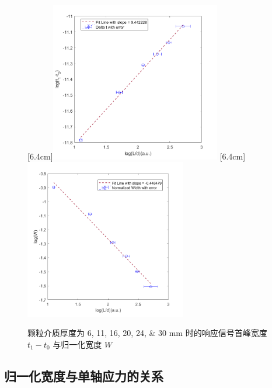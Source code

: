 \begin{figure}[!hbtp]
  \centering
                  [6.4cm]{\includegraphics[height=7cm]{figures/2_t1-t0_L.png}}
  \hspace{1cm}
                  [6.4cm]{\includegraphics[height=7cm]{figures/2_W_L.png}}
  \caption{颗粒介质厚度为 \numlist{6;11;16;20;24;30} \unit{\milli\metre} 时的响应信号首峰宽度 $t_{1} - t_{0}$ 与归一化宽度 $W$}
  \label{fig:normalized_width_versus_L}
\end{figure}

\subsection{归一化宽度与单轴应力的关系}

